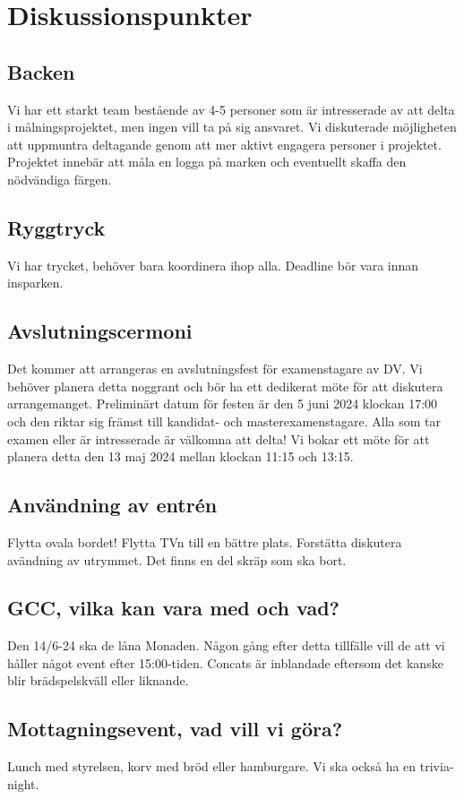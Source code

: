 \documentclass[protokoll]{dvd}
\begin{document}
\section{Diskussionspunkter} 

\subsection*{Backen}
Vi har ett starkt team bestående av 4-5 personer som är intresserade av att delta i målningsprojektet, men ingen vill ta på sig ansvaret. Vi diskuterade möjligheten att uppmuntra deltagande genom att mer aktivt engagera personer i projektet. Projektet innebär att måla en logga på marken och eventuellt skaffa den nödvändiga färgen.

\subsection*{Ryggtryck}
Vi har trycket, behöver bara koordinera ihop alla. Deadline bör vara innan insparken.

\subsection*{Avslutningscermoni}
Det kommer att arrangeras en avslutningsfest för examenstagare av DV. Vi behöver planera detta noggrant och bör ha ett dedikerat möte för att diskutera arrangemanget. Preliminärt datum för festen är den 5 juni 2024 klockan 17:00 och den riktar sig främst till kandidat- och masterexamenstagare. Alla som tar examen eller är intresserade är välkomna att delta! Vi bokar ett möte för att planera detta den 13 maj 2024 mellan klockan 11:15 och 13:15.

\subsection*{Användning av entrén}
Flytta ovala bordet! Flytta TVn till en bättre plats. Forstätta diskutera avändning av utrymmet. Det finns en del skräp som ska bort.

\subsection*{GCC, vilka kan vara med och vad?}
Den 14/6-24 ska de låna Monaden. Någon gång efter detta tillfälle vill de att vi håller något event efter 15:00-tiden.
Concats är inblandade eftersom det kanske blir brädspelskväll eller liknande.

\subsection*{Mottagningsevent, vad vill vi göra?}
Lunch med styrelsen, korv med bröd eller hamburgare. Vi ska också ha en trivia-night.
\end{document}
